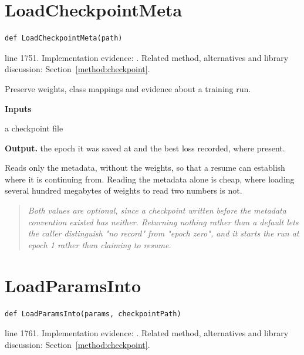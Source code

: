 \section{LoadCheckpointMeta}\label{fn:train:LoadCheckpointMeta}
\begin{lstlisting}[style=sig]
def LoadCheckpointMeta(path)
\end{lstlisting}
 line 1751. Implementation evidence: \cite{code2026}. Related method, alternatives and library discussion: Section~\ref{method:checkpoint}.


Preserve weights, class mappings and evidence about a training run.




\noindent\textbf{Inputs}
\begin{description}[leftmargin=2.2em,style=nextline,font=\normalfont\ttfamily]\setlength\itemsep{1pt}
  \item[{path}] \normalfont a checkpoint file
\end{description}

\noindent\textbf{Output.} the epoch it was saved at and the best loss recorded, where present.


Reads only the metadata, without the weights, so that a resume can establish where it is continuing from. Reading the metadata alone is cheap, where loading several hundred megabytes of weights to read two numbers is not.


\begin{quote}\small\itshape Both values are optional, since a checkpoint written before the metadata convention existed has neither. Returning nothing rather than a default lets the caller distinguish "no record" from "epoch zero", and it starts the run at epoch 1 rather than claiming to resume.\end{quote}


\section{LoadParamsInto}\label{fn:train:LoadParamsInto}
\begin{lstlisting}[style=sig]
def LoadParamsInto(params, checkpointPath)
\end{lstlisting}
 line 1761. Implementation evidence: \cite{code2026}. Related method, alternatives and library discussion: Section~\ref{method:checkpoint}.


